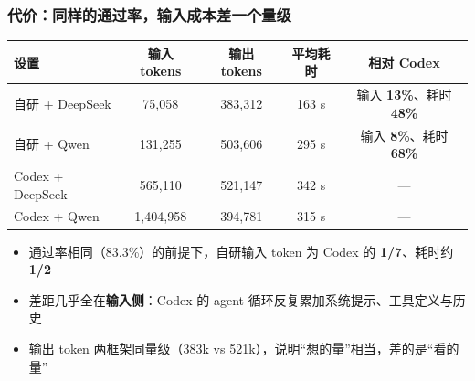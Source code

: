 \documentclass[10pt,aspectratio=169]{beamer}
\begin{document}
\begin{frame}
  \frametitle{代价：同样的通过率，输入成本差一个量级}

  \centering
  \small
  \setlength{\tabcolsep}{6pt}
  \renewcommand{\arraystretch}{1.2}
  \begin{tabular}{lcccc}
    \hline
    设置 & 输入 tokens & 输出 tokens & 平均耗时 & 相对 Codex \\
    \hline
    自研 + DeepSeek  & 75,058    & 383,312 & 163 s & 输入 \textbf{13\%}、耗时 \textbf{48\%} \\
    自研 + Qwen      & 131,255   & 503,606 & 295 s & 输入 \textbf{8\%}、耗时 \textbf{68\%} \\
    Codex + DeepSeek & 565,110   & 521,147 & 342 s & --- \\
    Codex + Qwen     & 1,404,958 & 394,781 & 315 s & --- \\
    \hline
  \end{tabular}

  \vspace{2.5mm}
  \begin{itemize}
    \item 通过率相同（83.3\%）的前提下，自研输入 token 为 Codex 的 \textbf{1/7}、耗时约 \textbf{1/2}
    \item 差距几乎全在\textbf{输入侧}：Codex 的 agent 循环反复累加系统提示、工具定义与历史
    \item 输出 token 两框架同量级（383k vs 521k），说明“想的量”相当，差的是“看的量”
  \end{itemize}
\end{frame}
\end{document}

